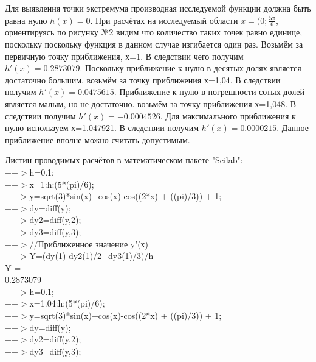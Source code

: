 \documentclass[russian,utf8,nocolumnxxxi,nocolumnxxxii]{eskdtext}
\begin{document}
Для выявления точки экстремума производная исследуемой функции должна быть равна нулю $h(x)=0$. При расчётах на исследуемый области $x=(0;\frac{5\pi}{6}$, ориентируясь по рисунку №2 видим что количество таких точек равно единице, поскольку поскольку функция в данном случае изгибается один раз.
Возьмём за первичную точку приближения, х=1. В следствии чего получим $h'(x)=0.2873079$. Поскольку приближение к нулю в десятых долях является достаточно большим, возьмём за точку приближения х=1,04. В следствии получим $h'(x)=0.0475615$. Приближение к нулю в погрешности сотых долей является малым, но не достаточно. возьмём за точку приближения х=1,048. В следствии получим $h'(x)=- 0.0004526$. Для максимального приближения к нулю используем х=1.047921. В следствии получим $h'(x)=0.0000215$. Данное приближение вполне можно считать допустимым.

Листин проводимых расчётов в математическом пакете "Scilab":\\
$-->$h=0.1;\\

$-->$x=1:h:(5*(pi)/6);\\

$-->$y=sqrt(3)*sin(x)+cos(x)-cos((2*x) + ((pi)/3)) + 1;\\

$-->$dy=diff(y);\\

$-->$dy2=diff(y,2);\\

$-->$dy3=diff(y,3);\\

$-->//$Приближенное значение y’(х)\\

$-->$Y=(dy(1)-dy2(1)/2+dy3(1)/3)/h\\
 Y  =\\

    0.2873079\\

$-->$h=0.1;\\

$-->$x=1.04:h:(5*(pi)/6);\\

$-->$y=sqrt(3)*sin(x)+cos(x)-cos((2*x) + ((pi)/3)) + 1;\\

$-->$dy=diff(y);\\

$-->$dy2=diff(y,2);\\

$-->$dy3=diff(y,3);\\
\end{document}
